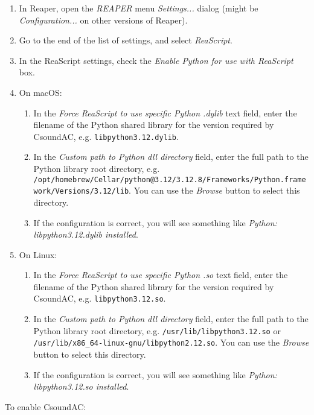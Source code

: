 \documentclass[letterpaper,10pt,DIV=12,parskip=half]{scrartcl}
\begin{document}
\begin{enumerate}
\item In Reaper, open the \emph{REAPER} menu \emph{Settings...} dialog (might be \emph{Configuration...} on other versions of Reaper).
\item Go to the end of the list of settings, and select \emph{ReaScript}.
\item In the ReaScript settings, check the \emph{Enable Python for use with ReaScript} box.
\item On macOS:
\begin{enumerate}
\item In the \emph{Force ReaScript to use specific Python .dylib} text field, enter the filename of the Python shared library for the version required by CsoundAC, e.g. \lstinline|libpython3.12.dylib|. 
\item In the \emph{Custom path to Python dll directory} field, enter the full path to the Python library root directory, e.g. \lstinline|/opt/homebrew/Cellar/python@3.12/3.12.8/Frameworks/Python.framework/Versions/3.12/lib|. You can use the \emph{Browse} button to select this directory.
\item If the configuration is correct, you will see something like \emph{Python: libpython3.12.dylib installed}.
\end{enumerate}
\item On Linux:
\begin{enumerate}
\item In the \emph{Force ReaScript to use specific Python .so} text field, enter the filename of the Python shared library for the version required by CsoundAC, e.g. \lstinline|libpython3.12.so|. 
\item In the \emph{Custom path to Python dll directory} field, enter the full path to the Python library root directory, e.g. \lstinline|/usr/lib/libpython3.12.so| or \lstinline|/usr/lib/x86_64-linux-gnu/libpython2.12.so|. You can use the \emph{Browse} button to select this directory.
\item If the configuration is correct, you will see something like \emph{Python: libpython3.12.so installed}.
\end{enumerate}
\end{enumerate}

\noindent To enable CsoundAC:
\end{document}
